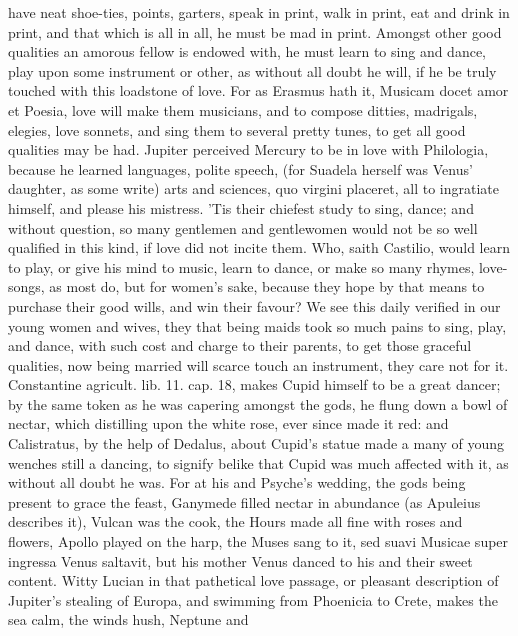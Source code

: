 {have neat shoe-ties, points, garters, speak in print, walk in print,
eat and drink in print, and that which is all in all, he must be mad in
print.
Amongst other good qualities an amorous fellow is endowed with, he must
learn to sing and dance, play upon some instrument or other, as without
all doubt he will, if he be truly touched with this loadstone of love.
For as Erasmus hath it, Musicam docet amor et Poesia, love will
make them musicians, and to compose ditties, madrigals, elegies, love
sonnets, and sing them to several pretty tunes, to get all good
qualities may be had. Jupiter perceived Mercury to be in love
with Philologia, because he learned languages, polite speech, (for
Suadela herself was Venus' daughter, as some write) arts and sciences,
quo virgini placeret, all to ingratiate himself, and please his
mistress. 'Tis their chiefest study to sing, dance; and without
question, so many gentlemen and gentlewomen would not be so well
qualified in this kind, if love did not incite them. Who, saith
Castilio, would learn to play, or give his mind to music, learn to
dance, or make so many rhymes, love-songs, as most do, but for women's
sake, because they hope by that means to purchase their good wills, and
win their favour? We see this daily verified in our young women and
wives, they that being maids took so much pains to sing, play, and
dance, with such cost and charge to their parents, to get those
graceful qualities, now being married will scarce touch an instrument,
they care not for it. Constantine agricult. lib. 11. cap. 18, makes
Cupid himself to be a great dancer; by the same token as he was
capering amongst the gods, he flung down a bowl of nectar, which
distilling upon the white rose, ever since made it red: and
Calistratus, by the help of Dedalus, about Cupid's statue made a
many of young wenches still a dancing, to signify belike that Cupid was
much affected with it, as without all doubt he was. For at his and
Psyche's wedding, the gods being present to grace the feast, Ganymede
filled nectar in abundance (as Apuleius describes it), Vulcan was
the cook, the Hours made all fine with roses and flowers, Apollo played
on the harp, the Muses sang to it, sed suavi Musicae super ingressa
Venus saltavit, but his mother Venus danced to his and their sweet
content. Witty Lucian in that pathetical love passage, or
pleasant description of Jupiter's stealing of Europa, and swimming from
Phoenicia to Crete, makes the sea calm, the winds hush, Neptune and
}
